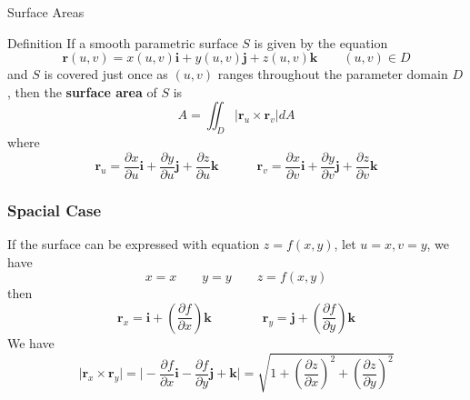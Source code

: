 \documentclass[aspectratio=169]{beamer}
\begin{document}
\begin{frame}{Surface Areas}
    \begin{block}{Definition}
        If a smooth parametric surface $S$ is given by the equation
         \begin{equation*}
            \boldsymbol{r}(u,v)=x(u,v)\boldsymbol{i}+y(u,v)\boldsymbol{j}+z(u,v)\boldsymbol{k} \qquad (u,v)\in D
        \end{equation*}
        and $S$ is covered just once as $(u,v)$ ranges throughout the parameter domain $D$, then the \textbf{surface area} of $S$ is
        \begin{equation*}
            A=\iint_D \big|\boldsymbol{r}_u\times\boldsymbol{r}_v\big|dA
        \end{equation*}
        where
        \begin{equation*}
            \boldsymbol{r}_u=\frac{\partial x}{\partial u}\boldsymbol{i}+\frac{\partial y}{\partial u}\boldsymbol{j}+\frac{\partial z}{\partial u}\boldsymbol{k} \quad \qquad \boldsymbol{r}_v=\frac{\partial x}{\partial v}\boldsymbol{i}+\frac{\partial y}{\partial v}\boldsymbol{j}+\frac{\partial z}{\partial v}\boldsymbol{k}
        \end{equation*}
    \end{block}
\end{frame}

\begin{frame}
    \frametitle{Spacial Case}
    \begin{block}
        If the surface can be expressed with equation $z=f(x,y)$, let $u=x,v=y$, we have
        \begin{equation*}
            x=x \qquad y=y \qquad z=f(x,y)
        \end{equation*}
        then
        \begin{equation*}
            \boldsymbol{r}_x=\boldsymbol{i}+(\frac{\partial f}{\partial x})\boldsymbol{k} \qquad \qquad \boldsymbol{r}_y=\boldsymbol{j}+(\frac{\partial f}{\partial y})\boldsymbol{k}
        \end{equation*}
        We have
        \begin{equation*}
            \big|\boldsymbol{r}_x\times\boldsymbol{r}_y\big|=\big|-\frac{\partial f}{\partial x}\boldsymbol{i}-\frac{\partial f}{\partial y}\boldsymbol{j}+\boldsymbol{k}\big|=\sqrt{1+(\frac{\partial z}{\partial x})^2+(\frac{\partial z}{\partial y})^2}
        \end{equation*}
    \end{block}
    
\end{frame}
\end{document}
